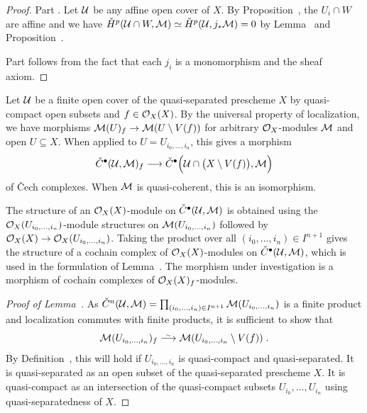 \documentclass[a4paper,parskip=half,numbers=enddot, DIV=12]{scrreprt}
\newcommand{\vC}{\v{C}}
\begin{document}
\begin{proof}
	Part . Let $\mathcal{U}$ be any affine open cover of $X$. By Proposition~, the $U_i\cap W$ are affine and we have $\check{H}^p(\mathcal{U}\cap W,\mathcal{M})\simeq \check{H}^p(\mathcal{U},j_*\mathcal{M})=0$ by Lemma~ and Proposition~.
	
	Part  follows from the fact that each $j_i$ is a monomorphism and the sheaf axiom.
\end{proof}
\begin{lem}
	Let $\mathcal{U}$ be a finite open cover of the quasi-separated prescheme $X$ by quasi-compact open subsets and $f\in\mathcal{O}_X(X)$. By the universal property of localization, we have morphisms $\Mm(U)_f\morphism\Mm(U\setminus V(f))$ for arbitrary $\mathcal{O}_X$-modules $\mathcal{M}$ and open $U\subseteq X$. When applied to $U=U_{i_0,\ldots,i_n}$, this gives a morphism
	\begin{align*}
		\check{C}^\bullet (\Uu,\Mm)_f\morphism\check{C}^\bullet \Big(\Uu\cap\big(X\setminus V(f)\big),\Mm\Big)
	\end{align*}
	of \vC ech complexes. When $\mathcal{M}$ is quasi-coherent, this is an isomorphism.
\end{lem}
\begin{rem*}
	The structure of an $\mathcal{O}_X(X)$-module on $\check{C}^\bullet (\mathcal{U},\mathcal{M})$ is obtained using the $\mathcal{O}_X(U_{i_0,\ldots,i_n})$-module structures on $\mathcal{M}(U_{i_0,\ldots,i_n})$ followed by $\Oo_X(X)\morphism \Oo_X(U_{i_0,\ldots,i_n})$. Taking the product over all $(i_0,\ldots,i_n)\in I^{n+1}$ gives the structure of a cochain complex of $\mathcal{O}_X(X)$-modules on $\check{C}^\bullet (\mathcal{U},\mathcal{M})$, which is used in the formulation of Lemma~. The morphism under investigation is a morphism of cochain complexes  of $\mathcal{O}_X(X)_f$-modules.
\end{rem*}
\begin{proof}[Proof of Lemma~]
	As $\check{C}^n(\mathcal{U},\mathcal{M})=\prod_{(i_0,\ldots,i_n)\in I^{n+1}}\mathcal{M}(U_{i_0,\ldots,i_n})$ is a finite product and localization commutes with finite products, it is sufficient to show that
	\begin{align*}
		\Mm(U_{i_0,\ldots,i_n})_f\isomorphism\Mm(U_{i_0,\ldots,i_n}\setminus V(f))\;.
	\end{align*}
	By Definition~, this will hold if $U_{i_0,\ldots,i_n}$ is quasi-compact and quasi-separated. It is quasi-separated as an open subset of the quasi-separated prescheme $X$. It is quasi-compact as an intersection of the quasi-compact subsets $U_{i_0},\ldots,U_{i_n}$ using quasi-separatedness of $X$.
\end{proof}
\end{document}

